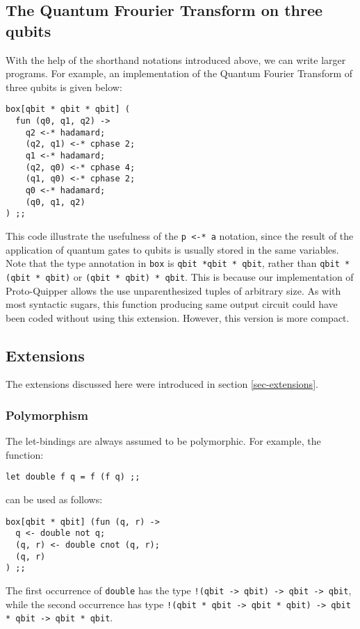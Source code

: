 \subsection{The Quantum Frourier Transform on three qubits}

With the help of the shorthand notations introduced above, we can write 
larger programs. For example, an implementation of the Quantum Fourier 
Transform of three qubits is given below:
\begin{verbatim}
box[qbit * qbit * qbit] (
  fun (q0, q1, q2) ->
    q2 <-* hadamard;
    (q2, q1) <-* cphase 2;
    q1 <-* hadamard;
    (q2, q0) <-* cphase 4;
    (q1, q0) <-* cphase 2;
    q0 <-* hadamard;
    (q0, q1, q2)
) ;;
\end{verbatim}
This code illustrate the usefulness of the \verb#p <-* a# notation, since 
the result of the application of quantum gates to qubits is usually stored 
in the same variables. Note that the type annotation in \verb#box# is 
\verb#qbit *qbit * qbit#, rather than \verb#qbit * (qbit * qbit)# or 
\verb#(qbit * qbit) * qbit#. This is because our implementation of 
Proto-Quipper allows the use unparenthesized tuples of arbitrary size. As 
with most syntactic sugars, this function producing same output circuit 
could have been coded without using this extension. However, this version 
is more compact. 

\subsection{Extensions}

The extensions discussed here were introduced in section 
\hyperref[sec-extensions]{\ref*{sec-extensions}}. 

\subsubsection{Polymorphism}

The let-bindings are always assumed to be polymorphic. For example, the 
function:
\begin{verbatim}
let double f q = f (f q) ;;
\end{verbatim}
can be used as follows:
\begin{verbatim}
box[qbit * qbit] (fun (q, r) ->
  q <- double not q;
  (q, r) <- double cnot (q, r);
  (q, r)
) ;;
\end{verbatim}
The first occurrence of \verb#double# has the type 
\verb#!(qbit -> qbit) -> qbit -> qbit#, while the second occurrence has type 
\verb#!(qbit * qbit -> qbit * qbit) -> qbit * qbit -> qbit * qbit#.

